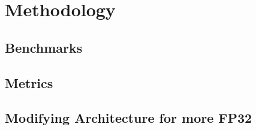 \section{Methodology}

\subsection{Benchmarks}

\subsection{Metrics}

\subsection{Modifying Architecture for more FP32}

